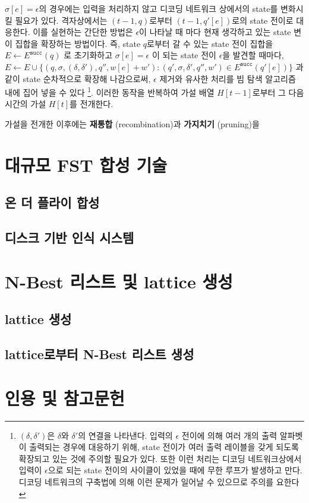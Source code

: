 \documentclass[../main.tex]{subfiles}
\begin{document}
$\sigma[e] = \epsilon$의 경우에는 입력을 처리하지 않고 디코딩 네트워크 상에서의 state를 변화시킬 필요가 있다. 
격자상에서는 $(t-1, q)$로부터 $(t-1, q'[e])$로의 state 전이로 대응한다. 
이를 실현하는 간단한 방법은 $\epsilon$이 나타날 때 마다 현재 생각하고 있는 state 변이 집합을 확장하는 방법이다. 
즉, state $q$로부터 갈 수 있는 state 전이 집합을 $E \leftarrow E^{\texttt{succ}}(q)$ 로 초기화하고 
$\sigma[e] = \epsilon$ 이 되는 state 전이 $\epsilon$을 발견할 때마다, 
$E \leftarrow E \cup \{ ( q, \sigma, (\delta, \delta'), q'', w[e] + w'): (q', \sigma, \delta', q'', w') \in E^{\texttt{succ}}(q'[e])\}$ 과 같이 state 순차적으로 확장해 나감으로써, 
$\epsilon$ 제거와 유사한 처리를 빔 탐색 알고리즘 내에 집어 넣을 수 있다
\footnote{$(\delta, \delta')$은 $\delta$와 $\delta'$의 연결을 나타낸다. 
입력의 $\epsilon$ 전이에 의해 여러 개의 출력 알파벳이 출력되는 경우에 대응하기 위해, state 전이가 여러 출력 레이블을 갖게 되도록 확장되고 있는 것에 주의할 필요가 있다. 또한 이런 처리는 디코딩 네트워크상에서 입력이 $\epsilon$으로 되는 state 전이의 사이클이 있었을 때에 무한 루프가 발생하고 만다. 디코딩 네트워크의 구축법에 의해 이런 문제가 일어날 수 있으므로 주의를 요한다}.
이러한 동작을 반복하여 가설 배열 $H[t-1]$로부터 그 다음 시간의 가설 $H[t]$를 전개한다. 

가설을 전개한 이후에는 \textbf{재통합} (recombination)과 \textbf{가지치기} (pruning)을 



\section{대규모 FST 합성 기술}
\subsection{온 더 플라이 합성}
\subsection{디스크 기반 인식 시스템}

\section{N-Best 리스트 및 lattice 생성}
\subsection{lattice 생성}
\subsection{lattice로부터 N-Best 리스트 생성}

\section*{인용 및 참고문헌}
\end{document}
